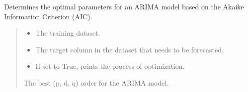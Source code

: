 \documentclass[letterpaper,10pt,english]{sphinxmanual}
\begin{document}
\begin{fulllineitems}
\label{\detokenize{docs/time_series_analysis:time_series_analysis.ARIMA_optimizer}}
\pysigstartsignatures
{}
\pysigstopsignatures
\sphinxAtStartPar
Determines the optimal parameters for an ARIMA model based on the Akaike Information Criterion (AIC).
\begin{quote}\begin{description}
\begin{itemize}
\item {} 
\sphinxAtStartPar
{} \textendash{} The training dataset.

\item {} 
\sphinxAtStartPar
{} \textendash{} The target column in the dataset that needs to be forecasted.

\item {} 
\sphinxAtStartPar
{} \textendash{} If set to True, prints the process of optimization.

\end{itemize}

\sphinxAtStartPar
The best (p, d, q) order for the ARIMA model.

\end{description}\end{quote}

\end{fulllineitems}

\end{document}
